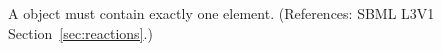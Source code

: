 A \KineticLaw object must contain exactly one  element.
(References: SBML L3V1 Section~\ref{sec:reactions}.)
